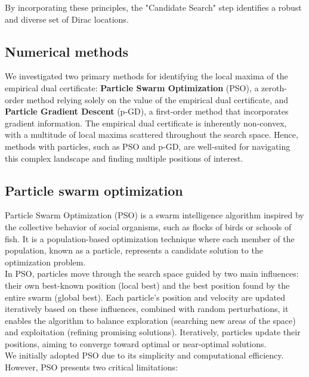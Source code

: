\documentclass[a4paper,12pt,oneside]{report}
\theoremstyle{named}
\begin{document}
By incorporating these principles, the "Candidate Search" step identifies a robust and diverse set of Dirac locations.

\subsection{Numerical methods}
We investigated two primary methods for identifying the local maxima of the empirical dual certificate: \textbf{Particle Swarm Optimization} (PSO), a zeroth-order method relying solely on the value of the empirical dual certificate, and  \textbf{Particle Gradient Descent} (p-GD), a first-order method that incorporates gradient information. The empirical dual certificate is inherently non-convex, with a multitude of local maxima scattered throughout the search space. Hence, methods with particles, such as PSO and p-GD, are well-suited for navigating this complex landscape and finding multiple positions of interest.

\subsection{Particle swarm optimization}
Particle Swarm Optimization (PSO) \cite{488968} is a swarm intelligence algorithm inspired by the collective behavior of social organisms, such as flocks of birds or schools of fish. It is a population-based optimization technique where each member of the population, known as a particle, represents a candidate solution to the optimization problem. \\

In PSO, particles move through the search space guided by two main influences: their own best-known position (local best) and the best position found by the entire swarm (global best). Each particle's position and velocity are updated iteratively based on these influences, combined with random perturbations, it enables the algorithm to balance exploration (searching new areas of the space) and exploitation (refining promising solutions). Iteratively, particles update their positions, aiming to converge toward optimal or near-optimal solutions. \\

We initially adopted PSO due to its simplicity and computational efficiency. However, PSO presents two critical limitations:
\end{document}
